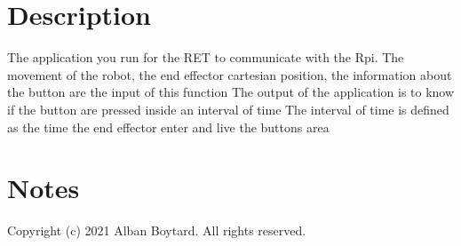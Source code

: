 \hypertarget{index_description_main}{}\section{Description}\label{index_description_main}
The application you run for the R\+ET to communicate with the Rpi. The movement of the robot, the end effector cartesian position, the information about the button are the input of this function The output of the application is to know if the button are pressed inside an interval of time The interval of time is defined as the time the end effector enter and live the button\textquotesingle{}s area\hypertarget{index_notes_main}{}\section{Notes}\label{index_notes_main}
Copyright (c) 2021 Alban Boytard. All rights reserved. 